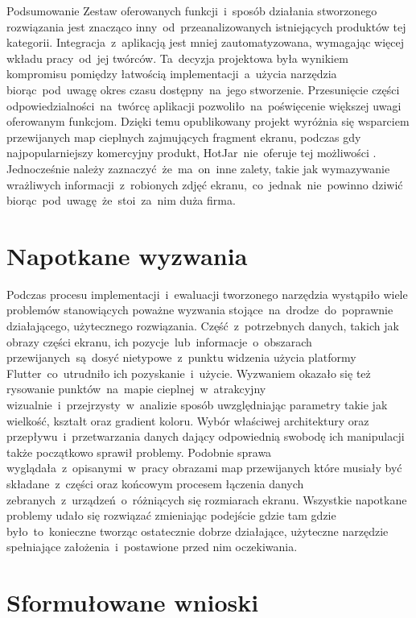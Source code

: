 \begin{chapter}{Podsumowanie}
	Zestaw oferowanych funkcji~i~sposób działania stworzonego rozwiązania jest znacząco inny~od~przeanalizowanych istniejących produktów tej kategorii. Integracja~z~aplikacją jest mniej zautomatyzowana, wymagając więcej wkładu pracy~od~jej twórców. Ta~decyzja projektowa była wynikiem kompromisu pomiędzy łatwością implementacji~a~użycia narzędzia biorąc~pod~uwagę okres czasu dostępny~na~jego stworzenie. Przesunięcie części odpowiedzialności~na~twórcę aplikacji pozwoliło~na~poświęcenie większej uwagi oferowanym funkcjom. Dzięki temu opublikowany projekt wyróżnia się wsparciem przewijanych map cieplnych zajmujących fragment ekranu, podczas gdy najpopularniejszy komercyjny produkt, HotJar~nie~oferuje tej możliwości \cite{Hotjar_limitations}. Jednocześnie należy zaznaczyć~że~ma~on~inne zalety, takie jak wymazywanie wrażliwych informacji~z~robionych zdjęć ekranu,~co~jednak~nie~powinno dziwić biorąc~pod~uwagę~że~stoi~za~nim duża firma.
		
	\section{Napotkane wyzwania}
	Podczas procesu implementacji~i~ewaluacji tworzonego narzędzia wystąpiło wiele problemów stanowiących poważne wyzwania stojące~na~drodze~do~poprawnie działającego, użytecznego rozwiązania. Część~z~potrzebnych danych, takich jak obrazy części ekranu, ich pozycje~lub~informacje~o~obszarach przewijanych~są~dosyć nietypowe~z~punktu widzenia użycia platformy Flutter~co~utrudniło ich pozyskanie~i~użycie. Wyzwaniem okazało się też rysowanie punktów~na~mapie cieplnej~w~atrakcyjny wizualnie~i~przejrzysty~w~analizie sposób uwzględniając parametry takie jak wielkość, kształt oraz gradient koloru. Wybór właściwej architektury oraz przepływu~i~przetwarzania danych dający odpowiednią swobodę ich manipulacji także początkowo sprawił problemy. Podobnie sprawa wyglądała~z~opisanymi~w~pracy obrazami map przewijanych które musiały być składane~z~części oraz końcowym procesem łączenia danych zebranych~z~urządzeń~o~różniących się rozmiarach ekranu. Wszystkie napotkane problemy udało się rozwiązać zmieniając podejście gdzie tam gdzie było~to~konieczne tworząc ostatecznie dobrze działające, użyteczne narzędzie spełniające założenia~i~postawione przed nim oczekiwania.
	
	\section{Sformułowane wnioski}

\end{chapter}

